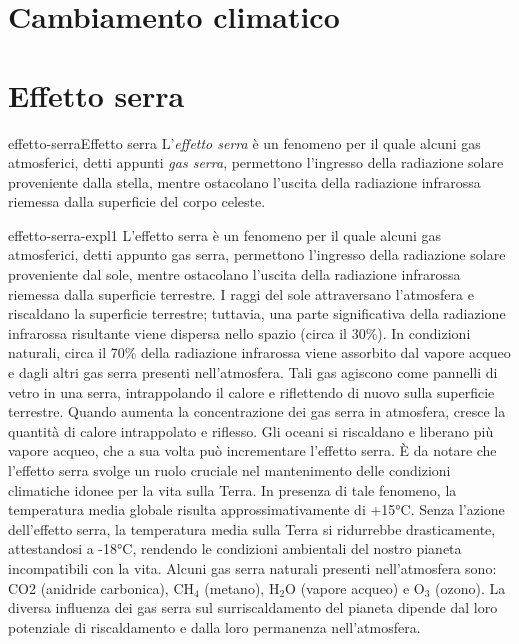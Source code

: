 \documentclass[preview]{standalone}
\begin{document}
\genpage

\section{Cambiamento climatico}

\section{Effetto serra}

\begin{snippetdefinition}{effetto-serra}{Effetto serra}
    L'\textit{effetto serra} è un fenomeno per il quale alcuni gas
    atmosferici, detti appunti \textit{gas serra},
    permettono l'ingresso della radiazione solare proveniente dalla stella, 
    mentre ostacolano l'uscita della radiazione infrarossa riemessa dalla
    superficie del corpo celeste.
\end{snippetdefinition}


\begin{snippet}{effetto-serra-expl1}
    L'effetto serra è un fenomeno per il quale alcuni gas atmosferici, detti appunto gas serra,
    permettono l'ingresso della radiazione solare proveniente dal sole, mentre ostacolano
    l'uscita della radiazione infrarossa riemessa dalla superficie terrestre.
    I raggi del sole attraversano l'atmosfera e riscaldano la superficie terrestre; tuttavia, una
    parte significativa della radiazione infrarossa risultante viene dispersa nello spazio (circa il
    30\%). In condizioni naturali, circa il 70\% della radiazione infrarossa viene assorbito dal
    vapore acqueo e dagli altri gas serra presenti nell'atmosfera. Tali gas agiscono come
    pannelli di vetro in una serra, intrappolando il calore e riflettendo di nuovo sulla superficie
    terrestre. Quando aumenta la concentrazione dei gas serra in atmosfera, cresce la quantità
    di calore intrappolato e riflesso. Gli oceani si riscaldano e liberano più vapore acqueo, che
    a sua volta può incrementare l'effetto serra.
    È da notare che l'effetto serra svolge un ruolo cruciale nel mantenimento delle condizioni
    climatiche idonee per la vita sulla Terra. In presenza di tale fenomeno, la temperatura media
    globale risulta approssimativamente di +15°C. Senza l'azione dell'effetto serra, la
    temperatura media sulla Terra si ridurrebbe drasticamente, attestandosi a -18°C, rendendo
    le condizioni ambientali del nostro pianeta incompatibili con la vita.
    Alcuni gas serra naturali presenti nell'atmosfera sono: CO2 (anidride carbonica), CH\({}_4\)
    (metano), H\({}_2\)O (vapore acqueo) e O\({}_3\) (ozono). La diversa influenza dei gas serra sul
    surriscaldamento del pianeta dipende dal loro potenziale di riscaldamento e dalla loro
    permanenza nell'atmosfera.
\end{snippet}
\end{document}

